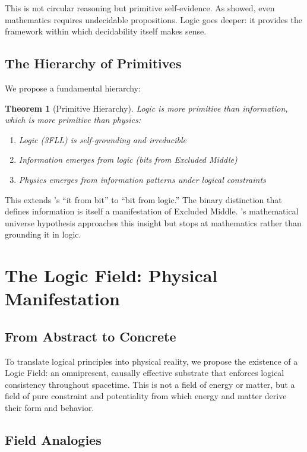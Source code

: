 \documentclass[12pt,a4paper]{article}
\newtheorem{theorem}{Theorem}
\begin{document}
This is not circular reasoning but primitive self-evidence. As \citet{godel1931formally} showed, even mathematics requires undecidable propositions. Logic goes deeper: it provides the framework within which decidability itself makes sense.

\subsection{The Hierarchy of Primitives}

We propose a fundamental hierarchy:

\begin{theorem}[Primitive Hierarchy]
Logic is more primitive than information, which is more primitive than physics:
\begin{enumerate}
\item Logic (3FLL) is self-grounding and irreducible
\item Information emerges from logic (bits from Excluded Middle)
\item Physics emerges from information patterns under logical constraints
\end{enumerate}
\end{theorem}

This extends \citet{wheeler1990information}'s ``it from bit'' to ``bit from logic.'' The binary distinction that defines information is itself a manifestation of Excluded Middle. \citet{tegmark2008mathematical}'s mathematical universe hypothesis approaches this insight but stops at mathematics rather than grounding it in logic.

\section{The Logic Field: Physical Manifestation}

\subsection{From Abstract to Concrete}

To translate logical principles into physical reality, we propose the existence of a Logic Field: an omnipresent, causally effective substrate that enforces logical consistency throughout spacetime. This is not a field of energy or matter, but a field of pure constraint and potentiality from which energy and matter derive their form and behavior.

\subsection{Field Analogies}
\end{document}
